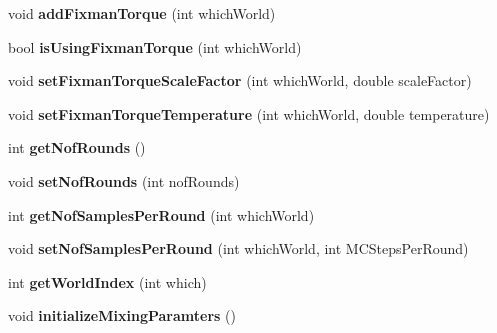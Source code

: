 \begin{DoxyCompactItemize}
\item 
void {\bfseries add\+Fixman\+Torque} (int which\+World)\hypertarget{classContext_a18cb34cca0c2b7934b9bd1170ddbd9d8}{}\label{classContext_a18cb34cca0c2b7934b9bd1170ddbd9d8}

\item 
bool {\bfseries is\+Using\+Fixman\+Torque} (int which\+World)\hypertarget{classContext_aaba8608b9266c8251019e2204b5d5f05}{}\label{classContext_aaba8608b9266c8251019e2204b5d5f05}

\item 
void {\bfseries set\+Fixman\+Torque\+Scale\+Factor} (int which\+World, double scale\+Factor)\hypertarget{classContext_af69b67139cca2e43cf3af0cc8114d8ea}{}\label{classContext_af69b67139cca2e43cf3af0cc8114d8ea}

\item 
void {\bfseries set\+Fixman\+Torque\+Temperature} (int which\+World, double temperature)\hypertarget{classContext_aa3cba363a73461a76cb9112b3868337d}{}\label{classContext_aa3cba363a73461a76cb9112b3868337d}

\item 
int {\bfseries get\+Nof\+Rounds} ()\hypertarget{classContext_afbc7cfc13d3d0f5780b7876216b8194f}{}\label{classContext_afbc7cfc13d3d0f5780b7876216b8194f}

\item 
void {\bfseries set\+Nof\+Rounds} (int nof\+Rounds)\hypertarget{classContext_a33526796ba166e7a7975956ad8ff0482}{}\label{classContext_a33526796ba166e7a7975956ad8ff0482}

\item 
int {\bfseries get\+Nof\+Samples\+Per\+Round} (int which\+World)\hypertarget{classContext_aad374e89822a443141d992b986ede2fe}{}\label{classContext_aad374e89822a443141d992b986ede2fe}

\item 
void {\bfseries set\+Nof\+Samples\+Per\+Round} (int which\+World, int M\+C\+Steps\+Per\+Round)\hypertarget{classContext_a1097bde655d6678da5a79f30ebbff621}{}\label{classContext_a1097bde655d6678da5a79f30ebbff621}

\item 
int {\bfseries get\+World\+Index} (int which)\hypertarget{classContext_a3dde15772536cf1d92da67b9bc7c9f9c}{}\label{classContext_a3dde15772536cf1d92da67b9bc7c9f9c}

\item 
void {\bfseries initialize\+Mixing\+Paramters} ()\hypertarget{classContext_aa5ce3f96fd7a71a4ea55599b1e4cbb16}{}\label{classContext_aa5ce3f96fd7a71a4ea55599b1e4cbb16}


\end{DoxyCompactItemize}
